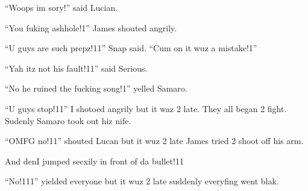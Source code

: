 \enquote{Woops im sory!} said Lucian.

\enquote{You fuking ashhole!1} James shouted angrily.

\enquote{U guys are such prepz!11} Snap said. \enquote{Cum on it wuz a mistake!1}

\enquote{Yah itz not his fault!11} said Serious.

\enquote{No he ruined the fucking song!1} yelled Samaro.

\enquote{U guys stop!11} I shotoed angrily but it waz 2 late. They all began 2 fight. Sudenly Samaro took out hiz nife.

\enquote{OMFG no!11} shouted Lucan but it wuz 2 late James tried 2 shoot off his arm.

And den\dotfill I jumped secxily in front of da bullet!11

\enquote{No!111} yielded everyone but it wuz 2 late suddenly everyfing went blak.
